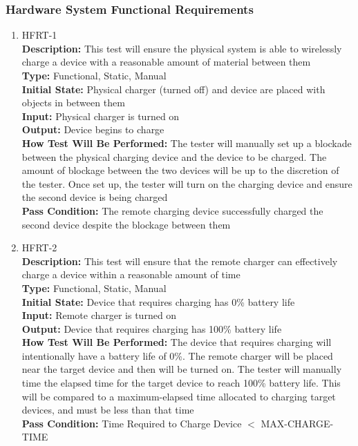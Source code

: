 \documentclass[12pt, titlepage]{article}
\begin{document}
\subsubsection{Hardware System Functional Requirements}
\begin{enumerate}
    \item{HFRT-1\\}
    \textbf{Description:} This test will ensure the physical system is able to wirelessly charge a device with a reasonable amount of material between them\\
    \textbf{Type:} Functional, Static, Manual\\
    \textbf{Initial State:} Physical charger (turned off) and device are placed with objects in between them\\
    \textbf{Input:} Physical charger is turned on\\
    \textbf{Output:} Device begins to charge\\
    \textbf{How Test Will Be Performed:} The tester will manually set up a blockade between the physical charging device and the device to be charged. The amount of blockage between the two devices will be up to the discretion of the tester. Once set up, the tester will turn on the charging device and ensure the second device is being charged\\ 
    \textbf{Pass Condition:} The remote charging device successfully charged the second device despite the blockage between them\\

    \item{HFRT-2\\}
    \textbf{Description:} This test will ensure that the remote charger can effectively charge a device within a reasonable amount of time\\
    \textbf{Type:} Functional, Static, Manual\\
    \textbf{Initial State:} Device that requires charging has 0\% battery life\\
    \textbf{Input:} Remote charger is turned on\\
    \textbf{Output:} Device that requires charging has 100\% battery life\\
    \textbf{How Test Will Be Performed:} The device that requires charging will intentionally have a battery life of 0\%. The remote charger will be placed near the target device and then will be turned on. The tester will manually time the elapsed time for the target device to reach 100\% battery life. This will be compared to a maximum-elapsed time allocated to charging target devices, and must be less than that time\\
    \textbf{Pass Condition:} Time Required to Charge Device $<$ MAX-CHARGE-TIME\\


\end{enumerate}
\end{document}

